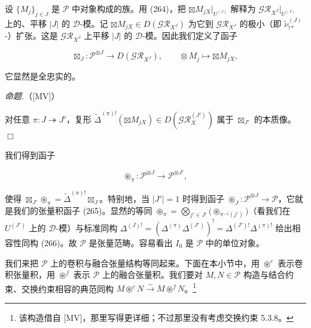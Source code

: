 
设 $\{M_j\}_{j\in J}$ 是 $\mathcal{P}$ 中对象构成的族。用 (264)，把 $\boxtimes M_{jX}|_{U^{(J)}}$ 解释为 $\mathcal{GR}_{X^{J}}|_{U^{(J)}}$ 上的、平移 $|J|$ 的 $\mathcal{D}$-模。记 $\boxtimes M_{jX}\in D(\mathcal{GR}_{X^{J}})$ 为它到 $\mathcal{GR}_{X^{J}}$ 的极小（即 $\tilde\nu^{(J)}_{!*}$-）扩张。这是 $\mathcal{GR}_{X^{J}}$ 上平移 $|J|$ 的 $\mathcal{D}$-模。因此我们定义了函子

\begin{equation}\tag{267}
\boxtimes_J:\mathcal{P}^{\otimes J}\to D(\mathcal{GR}_{X^{J}}),\qquad \otimes M_j\mapsto\boxtimes M_{jX},
\end{equation}

它显然是全忠实的。

 \emph{命题.}（[MV]）

对任意 $\pi:J\twoheadrightarrow J'$，复形 $\tilde\Delta^{(\pi)!}(\boxtimes M_{jX})\in D(\mathcal{GR}_X^{(J')})$ 属于 $\boxtimes_{J'}$ 的本质像。\hfill$\Box$

 我们得到函子

\begin{equation}\tag{268}
\circledast_\pi:\mathcal{P}^{\otimes J}\to\mathcal{P}^{\otimes J'},
\end{equation}

使得 $\boxtimes_{J'}\circledast_\pi=\tilde\Delta^{(\pi)!}\boxtimes_J$。特别地，当 $|J'|=1$ 时得到函子 $\circledast_J:\mathcal{P}^{\otimes J}\to\mathcal{P}$，它就是我们的张量积函子 (265)。显然的等同 $\circledast_\pi=\bigotimes_{j'\in J'}\bigl(\circledast_{\pi^{-1}(j')}\bigr)$（看我们在 $U^{(J')}$ 上的 $\mathcal{D}$-模）与标准同构 $\Delta^{(J)!}=(\Delta^{(\pi)}\Delta^{(J')})^{!}=\Delta^{(J')!}\Delta^{(\pi)!}$ 给出相容性同构 (266)。故 $\mathcal{P}$ 是张量范畴。容易看出 $I_0$ 是 $\mathcal{P}$ 中的单位对象。

 我们来把 $\mathcal{P}$ 上的卷积与融合张量结构等同起来。下面在本小节中，用 $\circledast^{c}$ 表示卷积张量积，用 $\circledast^{f}$ 表示 $\mathcal{P}$ 上的融合张量积。我们要对 $M,N\in\mathcal{P}$ 构造与结合约束、交换约束相容的典范同构 $M\circledast^{c}N\xrightarrow{\sim}M\circledast^{f}N$。\footnote{该构造借自 [MV]，那里写得更详细；不过那里没有考虑交换约束 5.3.8。}

